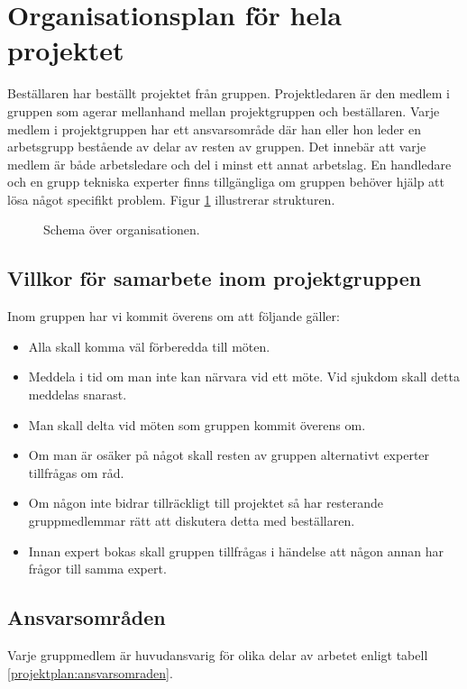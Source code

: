\section{Organisationsplan för hela projektet}
Beställaren har beställt projektet från gruppen. Projektledaren är den medlem i gruppen som agerar mellanhand mellan projektgruppen och beställaren. Varje medlem i projektgruppen har ett ansvarsområde där han eller hon leder en arbetsgrupp bestående av delar av resten av gruppen. Det innebär att varje medlem är både arbetsledare och del i minst ett annat arbetslag. En handledare och en grupp tekniska experter finns tillgängliga om gruppen behöver hjälp att lösa något specifikt problem. Figur \ref{projektplan:organisationsplan} illustrerar strukturen.

\begin{figure}[h!]
\center
{}%

%
\caption{Schema över organisationen.} \label{projektplan:organisationsplan}
\endcenter
\end{figure}

\subsection{Villkor för samarbete inom projektgruppen}
Inom gruppen har vi kommit överens om att följande gäller:
\begin{itemize}
\item{Alla skall komma väl förberedda till möten.}
\item{Meddela i tid om man inte kan närvara vid ett möte. Vid sjukdom skall detta meddelas snarast.}
\item{Man skall delta vid möten som gruppen kommit överens om.}
\item{Om man är osäker på något skall resten av gruppen alternativt experter tillfrågas om råd.}
\item{Om någon inte bidrar tillräckligt till projektet så har resterande gruppmedlemmar rätt att diskutera detta med beställaren.}
\item{Innan expert bokas skall gruppen tillfrågas i händelse att någon annan har frågor till samma expert.}
\end{itemize}

\newpage
\subsection{Ansvarsområden}
Varje gruppmedlem är huvudansvarig för olika delar av arbetet enligt tabell \ref{projektplan:ansvarsomraden}.

